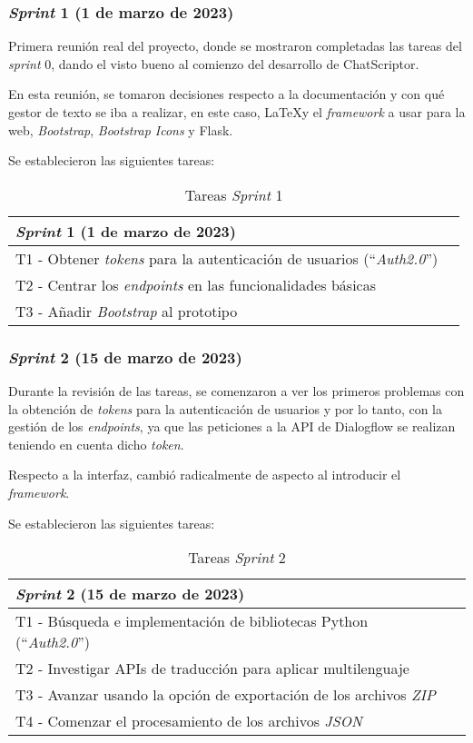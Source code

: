 \subsubsection{\textit{Sprint} 1 (1 de marzo de 2023)}
Primera reunión real del proyecto, donde se mostraron completadas las tareas del \textit{sprint} 0, dando el visto bueno al comienzo del desarrollo de ChatScriptor.

En esta reunión, se tomaron decisiones respecto a la documentación y con qué gestor de texto se iba a realizar, en este caso, \LaTeX y el \textit{framework} a usar para la web, \textit{Bootstrap}, \textit{Bootstrap Icons} y Flask.

Se establecieron las siguientes tareas:
\begin{table}[H]
\centering
\begin{tabular}{ll}
\toprule
\textit{Sprint} 1 (1 de marzo de 2023)   \\
\midrule
T1 - Obtener \textit{tokens} para la autenticación de usuarios (``\textit{Auth2.0}'')\\
T2 - Centrar los \textit{endpoints} en las funcionalidades básicas\\
T3 - Añadir \textit{Bootstrap} al prototipo\\
\bottomrule
\end{tabular}
\caption{Tareas \textit{Sprint} 1}
\end{table}

\subsubsection{\textit{Sprint} 2 (15 de marzo de 2023)}
Durante la revisión de las tareas, se comenzaron a ver los primeros problemas con la obtención de \textit{tokens} para la autenticación de usuarios y por lo tanto, con la gestión de los \textit{endpoints}, ya que las peticiones a la API de Dialogflow se realizan teniendo en cuenta dicho \textit{token}.

Respecto a la interfaz, cambió radicalmente de aspecto al introducir el \textit{framework}.

Se establecieron las siguientes tareas:
\begin{table}[H]
\centering
\begin{tabular}{ll}
\toprule
\textit{Sprint} 2 (15 de marzo de 2023)   \\
\midrule
T1 - Búsqueda e implementación de bibliotecas Python (``\textit{Auth2.0}'')\\
T2 - Investigar APIs de traducción para aplicar multilenguaje\\
T3 - Avanzar usando la opción de exportación de los archivos \textit{ZIP}\\
T4 - Comenzar el procesamiento de los archivos \textit{JSON} \\
\bottomrule
\end{tabular}
\caption{Tareas \textit{Sprint} 2}
\end{table}

